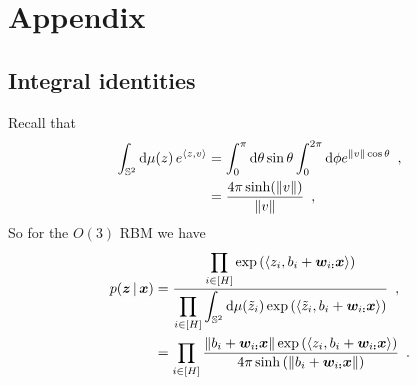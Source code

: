 \documentclass[12pt]{article}
\DeclareMathOperator{\sech}{sech}
\theoremstyle{definition}%
\theoremstyle{definition}
\theoremstyle{remark}
\begin{document}
\section{Appendix}
\subsection{Integral identities}
Recall that
\begin{align}
 \int_{\mathbb{S}^2} {\rm d}\mu(z) \, e^{\langle z, v \rangle} 
 	& = \int_0^\pi {\rm d}\theta \sin \theta \int_0^{2\pi} {\rm d}\phi e^{\Vert v \Vert \cos\theta} \enspace , \\
 	& = \frac{4\pi\sinh(\Vert v \Vert)}{\Vert v \Vert} \enspace ,
 \end{align}
So for the $O(3)$ RBM we have
\begin{align}
	p(\bm{z} \, | \, \bm{x}) 
		& = \frac{	\displaystyle\prod_{i \in[H]} \exp\left(\left\langle z_i, b_i+\bm{w}_{i\bm{:}} \bm{x} \right\rangle \right)}{	\displaystyle\prod_{i\in[H]} \int_{\mathbb{S}^2} {\rm d}\mu(\tilde{z}_i) \exp\left(\left\langle \tilde{z}_i, b_i+\bm{w}_{i\bm{:}} \bm{x}\right\rangle \right)} \enspace , \\
		& = \prod_{i\in[H]} \frac{\left\Vert b_i + \bm{w}_{i\bm{:}}\bm{x} \right\Vert \exp\left(\left\langle z_i, b_i+\bm{w}_{i\bm{:}} \bm{x} \right\rangle \right)}{4\pi\sinh\left(\left\Vert b_i + \bm{w}_{i\bm{:}} \bm{x} \right\Vert\right)} \enspace .
\end{align}

\end{document}
